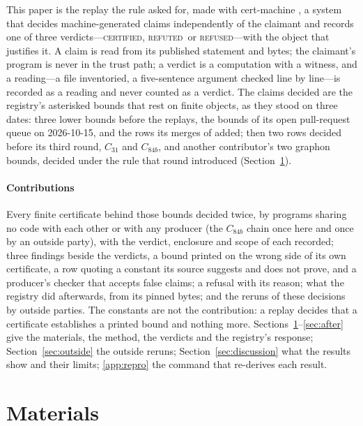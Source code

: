 \documentclass[preprint,11pt,authoryear,a4paper]{elsarticle}
\newcommand{\vword}[1]{{\normalfont\scshape #1}}
\newcommand{\vC}{\vword{certified}}
\newcommand{\vR}{\vword{refuted}}
\newcommand{\vF}{\vword{refused}}
\begin{document}
This paper is the replay the rule asked for, made with cert-machine \citep[the method paper]{CMArchive}, a system that decides machine-generated claims independently of the claimant and records one of three verdicts---\vC, \vR\ or \vF---with the object that justifies it. A claim is read from its published statement and bytes; the claimant's program is never in the trust path; a verdict is a computation with a witness, and a reading---a file inventoried, a five-sentence argument checked line by line---is recorded as a reading and never counted as a verdict. The claims decided are the registry's asterisked bounds that rest on finite objects, as they stood on three dates: three lower bounds before the replays, the \MtRqRows{} bounds of its open pull-request queue on 2026-10-15, and the rows its merges of \MtRgMergeDate{} added; then two rows decided before its third round, $C_{31}$ and $C_{84b}$, and another contributor's two graphon bounds, decided under the rule that round introduced (Section~\ref{sec:materials}).

\paragraph{Contributions} Every finite certificate behind those bounds decided twice, by programs sharing no code with each other or with any producer (the $C_{84b}$ chain once here and once by an outside party), with the verdict, enclosure and scope of each recorded; three findings beside the verdicts, a bound printed on the wrong side of its own certificate, a row quoting a constant its source suggests and does not prove, and a producer's checker that accepts false claims; a refusal with its reason; what the registry did afterwards, from its pinned bytes; and the reruns of these decisions by outside parties. The constants are not the contribution: a replay decides that a certificate establishes a printed bound and nothing more. Sections~\ref{sec:materials}--\ref{sec:after} give the materials, the method, the verdicts and the registry's response; Section~\ref{sec:outside} the outside reruns; Section~\ref{sec:discussion} what the results show and their limits; \ref{app:repro} the command that re-derives each result.

\section{Materials}\label{sec:materials}
\end{document}
